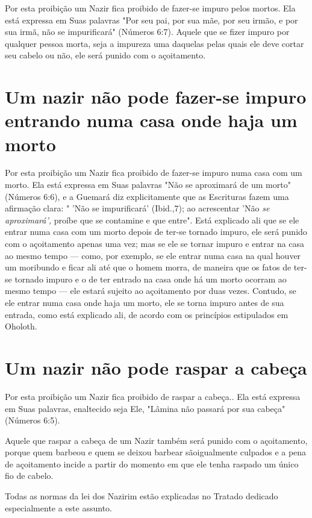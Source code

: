 \begin{itemize}
\begin{enumrate}
\begin{itemize}
\begin{itemize}
\begin{itemize}
Por esta proibição um Nazir fica proibido de fazer-se impuro pelos
mortos. Ela está expressa em Suas palavras "Por seu pai, por sua mãe,
por seu irmão, e por sua irmã, não se impurificará" (Números 6:7).
Aquele que se fizer impuro por qualquer pessoa morta, seja a impureza
uma daquelas pelas quais ele deve cortar seu cabelo ou não, ele será
punido com o açoitamento.

\section{Um nazir não pode fazer-se impuro entrando numa casa onde haja um
morto}

Por esta proibição um Nazir fica proibido de fazer-se impuro numa casa
com um morto. Ela está expressa em Suas palavras "Não se aproximará de
um morto" (Números 6:6), e a Guemará diz explicitamente que as
Escrituras fazem uma afirmação clara: " 'Não se impurificará' (Ibid.,7);
ao acrescentar 'Não \emph{se aproximará',} proíbe que se contamine e que
entre". Está explicado ali que se ele entrar numa casa com um morto
depois de ter-se tornado impuro, ele será punido com o açoitamento
apenas uma vez; mas se ele se tornar impuro e entrar na casa ao mesmo
tempo --- como, por exemplo, se ele entrar numa casa na qual houver um
moribundo e ficar ali até que o homem morra, de ma­neira que os fatos de
ter-se tornado impuro e o de ter entrado na casa onde há um morto
ocorram ao mesmo tempo --- ele estará sujeito ao açoitamento por duas
vezes. Contudo, se ele entrar numa casa onde haja um morto, ele se torna
impuro antes de sua entrada, como está explicado ali, de acordo com os
princípios estipulados em Oholoth.

\section{Um nazir não pode raspar a cabeça}

Por esta proibição um Nazir fica proibido de raspar a cabeça.. Ela es­tá
expressa em Suas palavras, enaltecido seja Ele, "Lâmina não passará por
sua cabeça" (Números 6:5).

Aquele que raspar a cabeça de um Nazir também será punido com o
açoitamento, porque quem barbeou e quem se deixou barbear sãoigualmen­te
culpados e a pena de açoitamento incide a partir do momento em que ele
tenha raspado um único fio de cabelo.

Todas as normas da lei dos Nazirim estão explicadas no Tratado de­dicado
especialmente a este assunto.


\end{itemize}
\end{itemize}
\end{itemize}
\end{enumrate}
\end{itemize}
